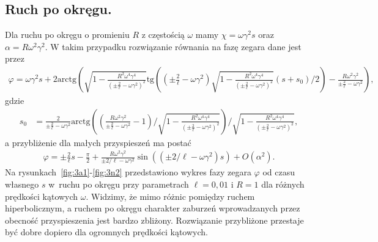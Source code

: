 \subsection{Ruch po okręgu.}
Dla ruchu po okręgu o promieniu $R$ z 
częstością $\omega$ mamy
$\chi = \omega \gamma^2 s$ oraz 
$\alpha = R\omega^2\gamma^2 $.
W takim przypadku rozwiązanie równania na fazę zegara dane jest przez
\begin{align}\nonumber
\varphi = \omega\gamma^2 s +  
2\text{arctg} \left( 
\sqrt{ 1-\frac{R^2\omega^4\gamma^4}{\left( \pm \frac{2}{\ell} 
-\omega\gamma^2 \right)^2 } }
\text{tg} \left( 
\left( \pm \frac{2}{\ell} -\omega\gamma^2 \right)
\sqrt{ 1-\frac{R^2\omega^4\gamma^4}{\left( \pm \frac{2}{\ell} 
-\omega\gamma^2 \right)^2 } }(s + s_0)/2
\right)  
- \frac{R \omega^2 \gamma^2}{\pm \frac{2}{\ell} -\omega\gamma^2}
\right),
\end{align}
gdzie
\begin{align*}
s_0 & = \frac{2}{\pm \frac{2}{\ell} -\omega\gamma^2} 
\text{arctg}  
\left( \left( \frac{R \omega^2 \gamma^2}{\pm \frac{2}{\ell} 
-\omega\gamma^2} - 1 \right) \Big /  
\sqrt{ 1-\frac{R^2\omega^4\gamma^4}{\left( \pm \frac{2}{\ell} 
-\omega\gamma^2 \right)^2 } }
\right)\Big /   
\sqrt{ 1-\frac{R^2\omega^4\gamma^4}{\left( \pm \frac{2}{\ell} 
-\omega\gamma^2 \right)^2 } } ,
\end{align*}
a przybliżenie dla małych przyspieszeń ma postać 
\begin{align}\nonumber
\varphi =  \pm \frac{2}{\ell}s - \frac{\pi}{2} 
+
\frac{R \omega^2 \gamma^2}{\pm 2/\ell - \omega\gamma^2}
\sin ( (\pm 2/\ell - \omega\gamma^2) s )  
+O(\alpha^2).
\end{align}
Na rysunkach~\ref{fig:3a1}-\ref{fig:3n2} przedstawiono 
wykres fazy zegara $\varphi$ od czasu własnego $s$ 
w~ruchu po okręgu przy parametrach
$\ell=0,01$ i $R=1$ dla różnych prędkości kątowych $\omega$. 
Widzimy, że mimo różnic pomiędzy ruchem hiperbolicznym, a 
ruchem po okręgu charakter zaburzeń wprowadzanych przez 
obecność przyspieszenia jest bardzo zbliżony.
Rozwiązanie przybliżone przestaje być dobre dopiero dla 
ogromnych prędkości kątowych.
